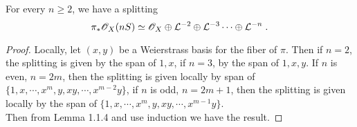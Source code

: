 \begin{proposition}
For every $n\geq 2$, we have a splitting
\[ \pi_* \mathscr{O}_X(nS)\simeq\mathscr{O}_X\oplus \mathcal{L}^{-2}\oplus \mathcal{L}^{-3}\cdots \oplus \mathcal{L}^{-n}\; . \]
\end{proposition}
\begin{proof}
Locally, let $(x,y)$ be a Weierstrass basis for the fiber of $\pi$. Then if $n=2$, the splitting is given by the span of $1,x$, if $n=3$, by the span of $1,x,y$. If $n$ is even, $n=2m$, then the splitting is given locally by span of $\{1,x,\cdots,x^m,y,xy,\cdots,x^{m-2}y\}$, if $n$ is odd, $n=2m+1$, then the splitting is given locally by the span of $\{1,x,\cdots,x^m,y,xy,\cdots,x^{m-1}y\}$.\\ \indent
Then from Lemma 1.1.4 and use induction we have the result.
\end{proof}


